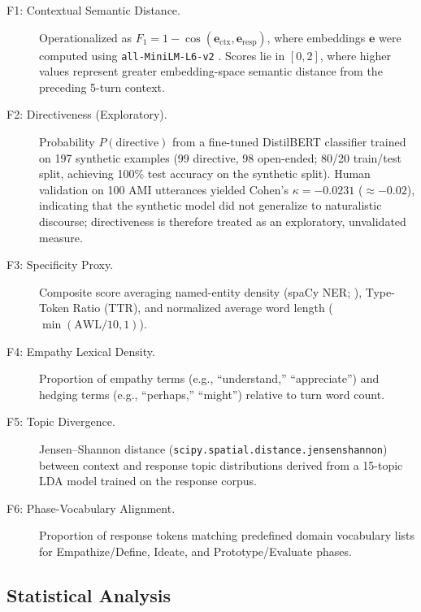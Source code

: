 \documentclass[preprint,12pt,authoryear]{elsarticle}
\begin{document}
\begin{description}
    \item[F1: Contextual Semantic Distance.] Operationalized as $F_1 = 1 - \cos(\mathbf{e}_{\text{ctx}}, \mathbf{e}_{\text{resp}})$, where embeddings $\mathbf{e}$ were computed using \texttt{all-MiniLM-L6-v2} \citep{reimers2019}. Scores lie in $[0, 2]$, where higher values represent greater embedding-space semantic distance from the preceding 5-turn context.
    
    \item[F2: Directiveness (Exploratory).] Probability $P(\text{directive})$ from a fine-tuned DistilBERT classifier \citep{sanh2019distilbert} trained on 197 synthetic examples (99 directive, 98 open-ended; 80/20 train/test split, achieving 100\% test accuracy on the synthetic split). Human validation on 100 AMI utterances yielded Cohen's $\kappa = -0.0231$ ($\approx -0.02$), indicating that the synthetic model did not generalize to naturalistic discourse; directiveness is therefore treated as an exploratory, unvalidated measure.

    \item[F3: Specificity Proxy.] Composite score averaging named-entity density (spaCy NER; \citealt{spacy2017}), Type-Token Ratio (TTR), and normalized average word length ($\min(\text{AWL}/10, 1)$).

    \item[F4: Empathy Lexical Density.] Proportion of empathy terms (e.g., ``understand,'' ``appreciate'') and hedging terms (e.g., ``perhaps,'' ``might'') relative to turn word count.

    \item[F5: Topic Divergence.] Jensen--Shannon distance (\texttt{scipy.spatial.distance.jensenshannon}) between context and response topic distributions derived from a 15-topic LDA model \citep{blei2003lda} trained on the response corpus.

    \item[F6: Phase-Vocabulary Alignment.] Proportion of response tokens matching predefined domain vocabulary lists for Empathize/Define, Ideate, and Prototype/Evaluate phases.
\end{description}

\subsection{Statistical Analysis}
\end{document}
